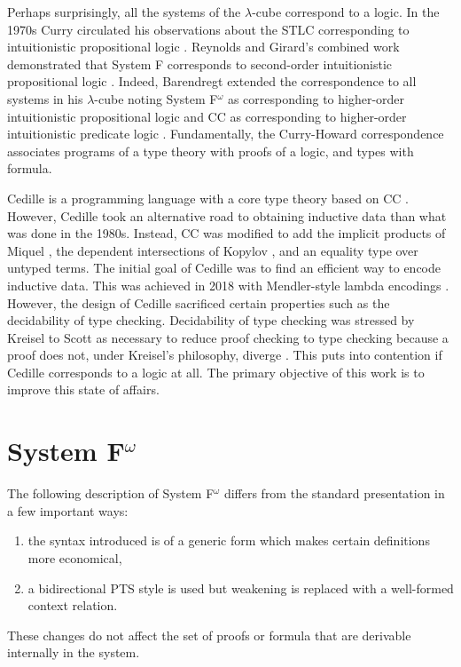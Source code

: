 Perhaps surprisingly, all the systems of the $\lambda$-cube correspond to a logic.
In the 1970s Curry circulated his observations about the STLC corresponding to intuitionistic propositional logic \cite{howard1980}.
Reynolds and Girard's combined work demonstrated that System F corresponds to second-order intuitionistic propositional logic \cite{girard1972,reynolds1974_systemf,reynolds1983}.
Indeed, Barendregt extended the correspondence to all systems in his $\lambda$-cube noting System F$^\omega$ as corresponding to higher-order intuitionistic propositional logic and CC as corresponding to higher-order intuitionistic predicate logic \cite{barendregt1991_pts}.
Fundamentally, the Curry-Howard correspondence associates programs of a type theory with proofs of a logic, and types with formula.

Cedille is a programming language with a core type theory based on CC \cite{stump2017_cdle,stump2021_cedillecore}.
However, Cedille took an alternative road to obtaining inductive data than what was done in the 1980s.
Instead, CC was modified to add the implicit products of Miquel \cite{miquel2001}, the dependent intersections of Kopylov \cite{kopylov2003}, and an equality type over untyped terms.
The initial goal of Cedille was to find an efficient way to encode inductive data.
This was achieved in 2018 with Mendler-style lambda encodings \cite{firsov2018_mendler}. 
However, the design of Cedille sacrificed certain properties such as the decidability of type checking.
Decidability of type checking was stressed by Kreisel to Scott as necessary to reduce proof checking to type checking because a proof does not, under Kreisel's philosophy, diverge \cite{scott1970}.
This puts into contention if Cedille corresponds to a logic at all.
The primary objective of this work is to improve this state of affairs.

\section{System \texorpdfstring{F$^\omega$}{F Omega}}

The following description of System F$^\omega$ differs from the standard presentation in a few important ways:
\begin{enumerate}
    \item the syntax introduced is of a generic form which makes certain definitions more economical,
    \item a bidirectional PTS style is used but weakening is replaced with a well-formed context relation.
\end{enumerate}
These changes do not affect the set of proofs or formula that are derivable internally in the system.

